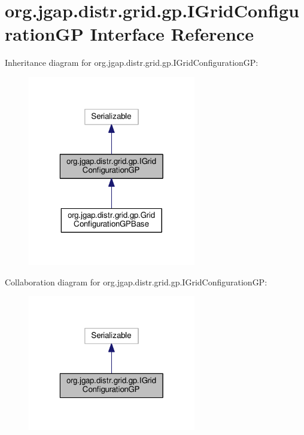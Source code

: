 \hypertarget{interfaceorg_1_1jgap_1_1distr_1_1grid_1_1gp_1_1_i_grid_configuration_g_p}{\section{org.\-jgap.\-distr.\-grid.\-gp.\-I\-Grid\-Configuration\-G\-P Interface Reference}
\label{interfaceorg_1_1jgap_1_1distr_1_1grid_1_1gp_1_1_i_grid_configuration_g_p}
}


Inheritance diagram for org.\-jgap.\-distr.\-grid.\-gp.\-I\-Grid\-Configuration\-G\-P\-:
\nopagebreak
\begin{figure}[H]
\begin{center}
\leavevmode
\includegraphics[width=208pt]{interfaceorg_1_1jgap_1_1distr_1_1grid_1_1gp_1_1_i_grid_configuration_g_p__inherit__graph}
\end{center}
\end{figure}


Collaboration diagram for org.\-jgap.\-distr.\-grid.\-gp.\-I\-Grid\-Configuration\-G\-P\-:
\nopagebreak
\begin{figure}[H]
\begin{center}
\leavevmode
\includegraphics[width=208pt]{interfaceorg_1_1jgap_1_1distr_1_1grid_1_1gp_1_1_i_grid_configuration_g_p__coll__graph}
\end{center}
\end{figure}
